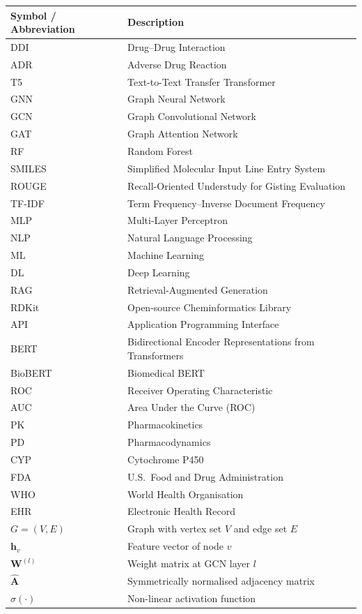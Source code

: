 \documentclass[12pt,a4paper,oneside]{report}
\begin{document}
\begin{longtable}{p{3.2cm} p{10cm}}
\toprule
\textbf{Symbol / Abbreviation} & \textbf{Description} \\
\midrule
DDI    & Drug--Drug Interaction \\
ADR    & Adverse Drug Reaction \\
T5     & Text-to-Text Transfer Transformer \\
GNN    & Graph Neural Network \\
GCN    & Graph Convolutional Network \\
GAT    & Graph Attention Network \\
RF     & Random Forest \\
SMILES & Simplified Molecular Input Line Entry System \\
ROUGE  & Recall-Oriented Understudy for Gisting Evaluation \\
TF-IDF & Term Frequency--Inverse Document Frequency \\
MLP    & Multi-Layer Perceptron \\
NLP    & Natural Language Processing \\
ML     & Machine Learning \\
DL     & Deep Learning \\
RAG    & Retrieval-Augmented Generation \\
RDKit  & Open-source Cheminformatics Library \\
API    & Application Programming Interface \\
BERT   & Bidirectional Encoder Representations from Transformers \\
BioBERT & Biomedical BERT \\
ROC    & Receiver Operating Characteristic \\
AUC    & Area Under the Curve (ROC) \\
PK     & Pharmacokinetics \\
PD     & Pharmacodynamics \\
CYP    & Cytochrome P450 \\
FDA    & U.S.\ Food and Drug Administration \\
WHO    & World Health Organisation \\
EHR    & Electronic Health Record \\
$G{=}(V,E)$        & Graph with vertex set $V$ and edge set $E$ \\
$\mathbf{h}_v$     & Feature vector of node $v$ \\
$\mathbf{W}^{(l)}$ & Weight matrix at GCN layer $l$ \\
$\hat{\mathbf{A}}$ & Symmetrically normalised adjacency matrix \\
$\sigma(\cdot)$    & Non-linear activation function \\
\bottomrule
\end{longtable}
\end{document}
